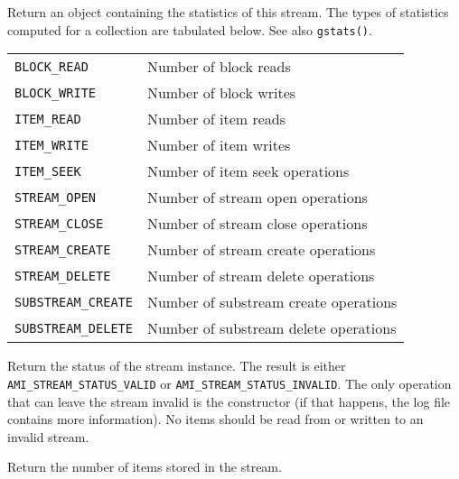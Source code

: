     {Return an object containing the statistics of this
      stream. The types of
        statistics computed for a collection are tabulated
        below. See also \lstinline|gstats()|.\\[1mm]
      \begin{tabular}{|l|l|} \hline \lstinline|BLOCK_READ| & Number of
        block reads\\ \lstinline|BLOCK_WRITE| & Number of block
        writes \\ \lstinline|ITEM_READ| & Number of item reads\\
        \lstinline|ITEM_WRITE| & Number of item writes\\ 
        \lstinline|ITEM_SEEK| & Number of item seek operations\\ 
        \lstinline|STREAM_OPEN| & Number of stream open operations\\ 
        \lstinline|STREAM_CLOSE| & Number of stream close operations
        \\ \lstinline|STREAM_CREATE| & Number of stream create
        operations\\ \lstinline|STREAM_DELETE| & Number of stream
        delete operations \\ \lstinline|SUBSTREAM_CREATE| & Number of
        substream create operations\\ \lstinline|SUBSTREAM_DELETE| &
        Number of substream delete operations \\ \hline \end{tabular}
    }

\etabb


  

  \btabb
     {Return the status
    of the stream instance. The result is either
    \lstinline|AMI_STREAM_STATUS_VALID| or
    \lstinline|AMI_STREAM_STATUS_INVALID|. The only operation that can
    leave the stream invalid is the constructor (if that happens, the log
    file contains more information). No items should be read from or
    written to an invalid stream.}
  
    {Return the number of items stored in
    the stream.}  
    

